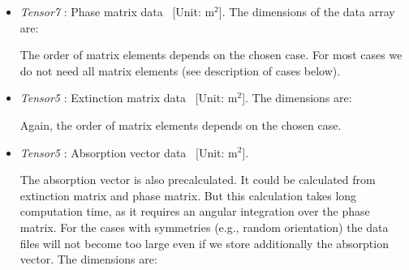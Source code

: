 \begin{itemize}
  The angular grids have to satisfy the following conditions:
  \begin{itemize}
  \item They have to be equidistant.
  \item The value of the data must be the same for the first and the
    last grid-point. This condition is required for the integration
    routine.
  \item If we only have to store a part of the grid, for example
     only from 0\degree to 90\degree, these two values (0\degree, 90\degree) must be
    grid-points. 
  \end{itemize}
  
\item {\sl Tensor7} : Phase matrix data
  \EnsAvr\PhaMat\ [Unit: m$^2$]. The dimensions of the data array are:  
  
  
  The order of matrix elements depends on the chosen case. For most
  cases we do not need all matrix elements (see description of cases
  below).

\item {\sl Tensor5} : Extinction matrix data
  \EnsAvr\ExtMat\ [Unit: m$^2$]. The dimensions are: 

  
  Again, the order of matrix elements depends on the chosen case.

\item {\sl Tensor5} : Absorption vector data
  \EnsAvr\AbsVec\ [Unit: m$^2$]. 
  
  The absorption vector is also precalculated. It could be calculated
  from extinction matrix and phase matrix. But this calculation takes
  long computation time, as it requires an angular integration over
  the phase matrix. For the cases with symmetries (e.g., random
  orientation) the data files will not become too large even if we
  store additionally the absorption vector. The dimensions are: 
  
\end{itemize}

